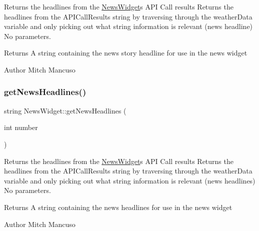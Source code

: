 Returns the headlines from the \mbox{\hyperlink{class_news_widget}{News\+Widget}}\textquotesingle{}s A\+PI Call results  Returns the headlines from the A\+P\+I\+Call\+Results string by traversing through the weather\+Data variable and only picking out what string information is relevant (news headline)  No parameters. 

\begin{DoxyReturn}{Returns}
A string containing the news story headline for use in the news widget 
\end{DoxyReturn}
\begin{DoxyAuthor}{Author}
Mitch Mancuso 
\end{DoxyAuthor}
\mbox{\label{class_news_widget_a488154d90869f16341f533e7a2c96dfd}} 
\subsubsection{\texorpdfstring{get\+News\+Headlines()}{getNewsHeadlines()}\hspace{0.1cm}{\footnotesize\ttfamily [2/2]}}
{\footnotesize\ttfamily string News\+Widget\+::get\+News\+Headlines (\begin{DoxyParamCaption}\item[{int}]{number }\end{DoxyParamCaption})}



Returns the headlines from the \mbox{\hyperlink{class_news_widget}{News\+Widget}}\textquotesingle{}s A\+PI Call results  Returns the headlines from the A\+P\+I\+Call\+Results string by traversing through the weather\+Data variable and only picking out what string information is relevant (news headlines)  No parameters. 

\begin{DoxyReturn}{Returns}
A string containing the news headlines for use in the news widget 
\end{DoxyReturn}
\begin{DoxyAuthor}{Author}
Mitch Mancuso 
\end{DoxyAuthor}
\mbox{\label{class_news_widget_a8528a1c4a46e6d2cf124fcb1720f5860}} 
